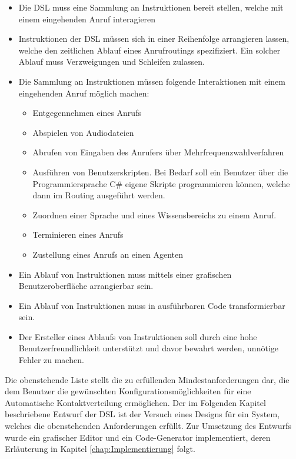 \begin{itemize}
\item Die DSL muss eine Sammlung an Instruktionen bereit stellen, welche mit einem eingehenden Anruf interagieren
\item Instruktionen der DSL müssen sich in einer Reihenfolge arrangieren lassen, welche den zeitlichen Ablauf eines Anrufroutings spezifiziert. Ein solcher Ablauf muss Verzweigungen und Schleifen zulassen.
\item Die Sammlung an Instruktionen müssen folgende Interaktionen mit einem eingehenden Anruf möglich machen:
	\begin{itemize}
	\item Entgegennehmen eines Anrufs
	\item Abspielen von Audiodateien 
	\item Abrufen von Eingaben des Anrufers über Mehrfrequenzwahlverfahren
	\item Ausführen von Benutzerskripten. Bei Bedarf soll ein Benutzer über die Programmiersprache C\# eigene Skripte programmieren können, welche dann im Routing ausgeführt werden.
	\item Zuordnen einer Sprache und eines Wissensbereichs zu einem Anruf.
	\item Terminieren eines Anrufs
	\item Zustellung eines Anrufs an einen Agenten
	\end{itemize}
\item Ein Ablauf von Instruktionen muss mittels einer grafischen Benutzeroberfläche arrangierbar sein.
\item Ein Ablauf von Instruktionen muss in ausführbaren Code transformierbar sein.
\item Der Ersteller eines Ablaufs von Instruktionen soll durch eine hohe Benutzerfreundlichkeit unterstützt und davor bewahrt werden, unnötige Fehler zu machen.  
\end{itemize}
Die obenstehende Liste stellt die zu erfüllenden Mindestanforderungen dar, die dem Benutzer die gewünschten Konfigurationsmöglichkeiten für eine Automatische Kontaktverteilung ermöglichen. Der im Folgenden Kapitel beschriebene Entwurf der DSL ist der Versuch  eines Designs für ein System, welches die obenstehenden Anforderungen erfüllt. Zur Umsetzung des Entwurfs wurde ein grafischer Editor und ein Code-Generator implementiert, deren Erläuterung in Kapitel \ref{chap:Implementierung} folgt.

